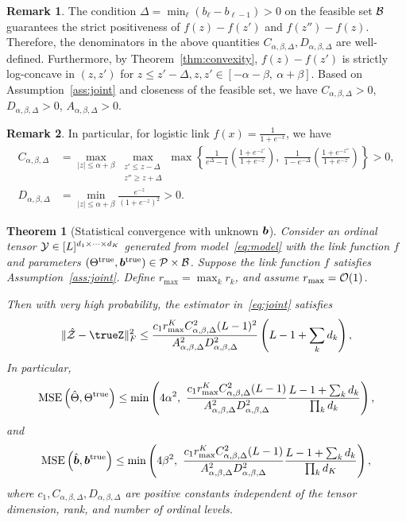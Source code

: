\documentclass{article}
\theoremstyle{plain}
\newtheorem{thm}{Theorem}[section]
\theoremstyle{definition}
\newtheorem{rmk}{Remark}
\begin{document}
\begin{rmk}
The condition $\Delta=\min_{\ell}(b_{\ell}-b_{\ell-1})>0$ on the feasible set $\mathcal{B}$ guarantees the strict positiveness of $f(z)-f(z')$ and $f(z'')-f(z)$. Therefore, the denominators in the above quantities $C_{\alpha,\beta,\Delta}, D_{\alpha,\beta,\Delta}$ are well-defined. Furthermore, by Theorem~\ref{thm:convexity}, $f(z)-f(z')$ is strictly log-concave in $(z,z')$ for $z\leq z'-\Delta, z,z'\in[-\alpha-\beta,\ \alpha+\beta]$. Based on Assumption~\ref{ass:joint} and closeness of the feasible set, we have $C_{\alpha,\beta,\Delta}>0$, $D_{\alpha,\beta,\Delta}>0$, $A_{\alpha,\beta,\Delta}>0$.
\end{rmk}
\begin{rmk} In particular, for logistic link $f(x)= \frac{1}{1+e^{-x}}$, we have
\begin{align}
C_{\alpha,\beta,\Delta}&=\max_{|z|\leq \alpha+\beta}\max_{\substack{z'\leq z-\Delta\\z''\geq z+\Delta}}\max\left\{ \frac{1}{e^\Delta-1}\left(\frac{1+e^{-z'}}{1+e^{-z}}\right),\ \frac{1}{1-e^{-\Delta}}\left(\frac{1+e^{-z''}}{1+e^{-z}}\right)\right\}>0,\\
D_{\alpha,\beta,\Delta}&=\min_{|z|\leq \alpha+\beta}\frac{e^{-z}}{(1+e^{-z})^2}>0.\end{align}
\end{rmk}
\begin{thm}[Statistical convergence with unknown $\bm{b}$]\label{thm:ratejoint}
Consider an ordinal tensor $\mathcal{Y}\in[L]^{d_1\times \cdots \times d_K}$ generated from model~\eqref{eq:model} with the link function $f$ and parameters $(\Theta^{\text{true}}, \bm{b}^{\text{true}})\in\mathcal{P}\times \mathcal{B}$. Suppose the link function $f$ satisfies Assumption~\ref{ass:joint}. Define $r_{\max}=\max_k r_k$, and assume $r_{\max}=\mathcal{O}(1)$. 

Then with very high probability, the estimator in~\eqref{eq:joint} satisfies
\begin{equation}\label{eq:scoreZ}
\FnormSize{}{\hat \tZ-\trueZ}^2 \leq {c_1r^{K}_{\max}C^2_{\alpha,\beta,\Delta}(L-1)^2\over A^2_{\alpha,\beta,\Delta}D^2_{\alpha,\beta,\Delta}}\left(L-1+\sum_k d_k\right),
\end{equation}
In particular,
\begin{equation}\label{eq:jointTheta}
\mathrm{MSE}\left(\hat \Theta, \Theta^{\text{true}} \right)\leq\min\left( 4\alpha^2,\  {c_1 r_{\max}^{K}  C_{\alpha,\beta,\Delta}^2(L-1)  \over A^2_{\alpha,\beta,\Delta}D_{\alpha,\beta,\Delta}^2}{ L-1+\sum_k d_k \over \prod_k d_k}\right),
\end{equation}
and
\begin{equation}\label{eq:jointb}
\mathrm{MSE}\left(\hat {\bm{b}}, \bm{b}^{\text{true}} \right)\leq \min\left(4\beta^2,\ {c_1 r^{K}_{\max} C^2_{\alpha,\beta,\Delta} (L-1)\over A^2_{\alpha,\beta,\Delta}D_{\alpha,\beta,\Delta}^2}{L-1+\sum_kd_k \over \prod_k d_K}\right),
\end{equation}
where $c_1, C_{\alpha,\beta,\Delta}, D_{\alpha,\beta,\Delta}$ are positive constants independent of the tensor dimension, rank, and number of ordinal levels. 
\end{thm}
\end{document}

